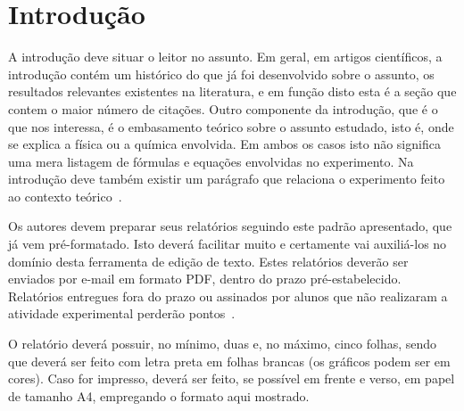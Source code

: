 \documentclass[a4paper, 12pt]{article}
\begin{document}

\section{Introdução}\label{intro}
A introdução deve situar o leitor no assunto. Em geral, em artigos científicos, a introdução contém um histórico do que já foi desenvolvido sobre o assunto, os resultados relevantes existentes na literatura, e em função disto esta é a seção que contem o maior número de citações. Outro componente da introdução, que é o que nos interessa, é o embasamento teórico sobre o assunto estudado, isto é, onde se explica a física ou a química envolvida. Em ambos os casos isto não significa uma mera listagem de fórmulas e equações envolvidas no experimento. Na introdução deve também existir um parágrafo que relaciona o experimento feito ao contexto teórico~\cite{Fisica-II}.

Os autores devem preparar seus relatórios seguindo este padrão apresentado, que já vem pré-formatado. Isto deverá facilitar muito e certamente vai auxiliá-los no domínio desta ferramenta de edição de texto.
Estes relatórios deverão ser enviados por e-mail em formato PDF, dentro do prazo pré-estabelecido. Relatórios entregues fora do prazo ou assinados por alunos que não realizaram a atividade experimental perderão pontos~\cite{Halliday-II}.

O relatório deverá possuir, no mínimo, duas e, no máximo, cinco folhas, sendo que deverá ser feito com letra preta em folhas brancas (os gráficos podem ser em cores). Caso for impresso, deverá ser feito, se possível em frente e verso, em papel de tamanho A4, empregando o formato aqui mostrado.
\end{document}
